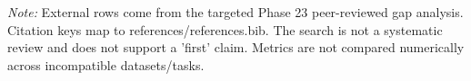 \begin{table}[t]
{\begin{tabular}{llllllll}
\bottomrule
\end{tabular}%
}
\vspace{2pt}
\begin{minipage}{0.98\textwidth}
\footnotesize \textit{Note:} External rows come from the targeted Phase 23 peer-reviewed gap analysis. Citation keys map to references/references.bib. The search is not a systematic review and does not support a 'first' claim. Metrics are not compared numerically across incompatible datasets/tasks.
\end{minipage}
\end{table}
